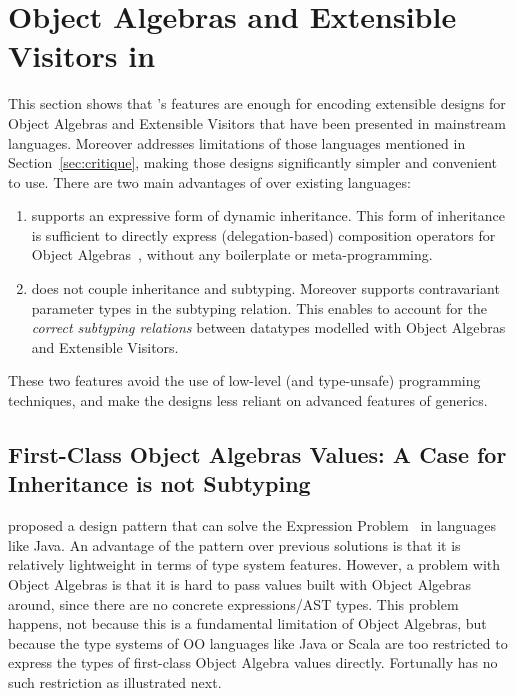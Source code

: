 \section{Object Algebras and Extensible Visitors in \name}
\label{sec:OA}

This section shows that \name's features are enough for encoding extensible
designs for Object Algebras and Extensible Visitors that have been presented in
mainstream languages. Moreover \name addresses limitations of those languages
mentioned in Section~\ref{sec:critique}, making those designs significantly
simpler and convenient to use. There are two main advantages of \name over
existing languages:
\begin{enumerate}
\item \name supports an expressive form of dynamic inheritance. This form
  of inheritance is sufficient to directly express (delegation-based) composition
  operators for Object Algebras~\cite{oliveira2012extensibility}, without any boilerplate or meta-programming.
\item \name does not couple inheritance and subtyping. Moreover
\name supports contravariant parameter types in the subtyping
relation. This enables \name to account for the \emph{correct
subtyping relations} between datatypes modelled with Object Algebras 
and Extensible Visitors.
\end{enumerate}

These two features avoid the use of low-level (and type-unsafe) programming
techniques, and make the designs less reliant on advanced
features of generics.


\subsection{First-Class Object Algebras Values: A Case for Inheritance
is not Subtyping}
\label{sec:objectalgebra}

\citet{oliveira2012extensibility} proposed a design pattern that can solve the
Expression Problem~\cite{wadler1998expression} in languages like Java. An
advantage of the pattern over previous solutions is that it is relatively
lightweight in terms of type system features. However, a problem with Object
Algebras is that it is hard to pass values built with Object Algebras around,
since there are no concrete expressions/AST types. This problem happens, not
because this is a fundamental limitation of Object Algebras, but because the
type systems of OO languages like Java or Scala are too restricted to express
the types of first-class Object Algebra values directly. Fortunally \name has no
such restriction as illustrated next.

